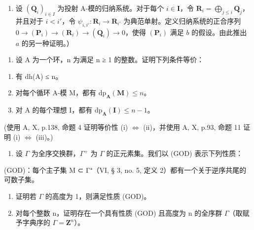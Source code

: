 \begin{enumerate}
\def\labelenumi{\alph{enumi})}
\setcounter{enumi}{2}
\tightlist
\item
  设 \((\mathbf{Q}_i)_{i\in I}\) 为投射 A-模的归纳系统。对于每个 \(i\in \mathbf{I}\)，令 \(\mathbf{R}_i = \bigoplus_{j\leqslant i}\mathbf{Q}_j\)，并且对于 \(i < i'\)，令 \(\psi_{i,i'}: \mathbf{R}_i \to \mathbf{R}_{i'}\) 为典范单射。定义归纳系统的正合序列 \(0 \to (\mathbf{P}_i) \to (\mathbf{R}_i) \to (\mathbf{Q}_i) \to 0\)，使得 \((\mathbf{P}_i)\) 满足 \(b\) 的假设。由此推出 \(a\) 的另一种证明。）
\end{enumerate}

\begin{enumerate}
\def\labelenumi{\arabic{enumi})}
\setcounter{enumi}{7}
\tightlist
\item
  设 A 为一个环，n 为满足 n ≥ 1 的整数。证明下列条件等价：
\end{enumerate}

\begin{enumerate}
\def\labelenumi{(\roman{enumi})}
\item
  有 dh(A) ≤ n。
\item
  对每个循环 A-模 M，都有 \(\mathrm{dp}_{\mathbf{A}}(\mathbf{M}) \leqslant n\)。
\item
  对 A 的每个理想 I，都有 \(\mathrm{dp}_{\mathbf{A}}(\mathbf{I}) \leqslant n - 1\)。
\end{enumerate}

(使用 A, X, p.138, 命题 4 证明等价性 (i) \(\Leftrightarrow\) (ii)，并使用 A, X, p.93, 命题 11 证明 (i) \(\Leftrightarrow\) (iii)。)

\begin{enumerate}
\def\labelenumi{\arabic{enumi})}
\setcounter{enumi}{8}
\tightlist
\item
  设 \(\Gamma\) 为全序交换群，\(\Gamma^{+}\) 为 \(\Gamma\) 的正元素集。我们以 (GOD) 表示下列性质：
\end{enumerate}

(GOD)：每个主子集 M ⊂ Γ⁺（VI, § 3, no. 5, 定义 2）都有一个关于逆序共尾的可数子集。

\begin{enumerate}
\def\labelenumi{\alph{enumi})}
\item
  证明若 \(\Gamma\) 的高度为 1，则满足性质 (GOD)。
\item
  对每个整数 n，证明存在一个具有性质 (GOD) 且高度为 n 的全序群 \(\Gamma\)（取赋予字典序的 \(\Gamma = \mathbf{Z}^{n}\)）。
\end{enumerate}

